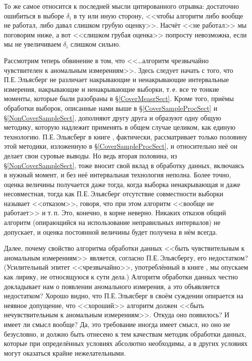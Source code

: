 \documentclass[a5paper,openany]{book}
\begin{document}
То же самое относится к последней мысли цитированного отрывка: достаточно ошибиться 
в выборе $\delta_i$ в ту или иную сторону, <<чтобы алгоритм либо вообще не работал, 
либо давал слишком грубую оценку>>. Насчёт <<не работал>> мы поговорим ниже, а вот 
<<слишком грубая оценка>> попросту невозможна, если мы не увеличиваем  $\delta_i$ 
слишком сильно. 
  
Рассмотрим теперь обвинение в том, что <<\ldots алгоритм чрезвычайно чувствителен 
к аномальным измерениям>>. Здесь следует начать с того, что П.Е.\,Эльясберг 
не различает накрывающие и ненакрывающие интервальные измерения, накрывающие 
и ненакрывающие выборки, т.\,е. все те тонкие моменты, которые были разобраны 
в  \S\ref{CoverMeasrSect}. Кроме того, приёмы обработки выборок, описанные нами выше 
в \S\ref{CoverSampleProcSect} и \S\ref{NonCoverSampleSect}, дополняют другу друга и 
образуют одну общую методику, которую надлежит применять в общем случае целиком, 
как единую технологию. П.Е.\,Эльясберг в книге \cite{Eliasberg83}, фактически, 
рассматривает только половину этой методики, изложенную в \S\ref{CoverSampleProcSect}, 
и относительно неё он делает свои суровые выводы. Но ведь вторая половина, 
из  \S\ref{NonCoverSampleSect}, тоже вносит свой вклад в обработку данных, включаясь 
в нужный момент, и без неё интервальная технология неполна. Более точно, оценка 
величины получается даже тогда, когда выборка ненакрывающая и даже несовместная, 
тогда как П.Е.\,Эльясберг отсутствие совместности выборки называет <<отказом>>, 
говоря, что при этом алгоритм <<вообще не работает>> и т.\,п. Это, конечно, в корне 
неверно. Никаких отказов общий алгоритм (опирающийся на использование неправильных 
интервалов) не допускает, и оценка постоянной величины будет получена в нём всегда. 
  
Далее, почему свойство алгоритма обработки данных <<быть чувствительным к аномальным 
измерениям>> является, согласно П.Е.\,Эльясбергу, его недостатком? (Усилительный эпитет 
<<чрезвычайно>>, употреблённый в книге \cite{Eliasberg83}, мы опускаем как лирику, 
не относящуюся к сути дела.) Алгоритм обработки данных честно докладывает нам 
о появлении аномального измерения, а это объявляется недостатком? Хорошо видно, 
что П.Е.\,Эльясберг в своём суждении опирается на неявное допущение, что <<хороший>> 
алгоритм должен <<быть нечувствительным к аномальным измерениям>>. Откуда оно появилось? 
И имеет ли смысл вообще? Да, это требование иногда имеет смысл, но оно не безусловно, 
и должно быть отнесено к тем качествам методик обработки данных, которые при определённых 
условиях абсолютно необходимы, а в других условиях могут оказаться крайне нежелательными. 
  
\end{document}
